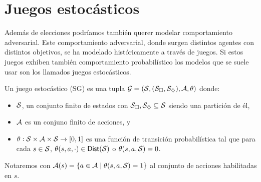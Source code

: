 



\section{Juegos estocásticos}

Además de elecciones podríamos también querer modelar comportamiento
adversarial. Este comportamiento adversarial, donde surgen distintos agentes
con distintos objetivos, se ha modelado históricamente a través de juegos. Si
estos juegos exhiben también comportamiento probabilístico los modelos que se
suele usar son los llamados juegos estocásticos.

\begin{definition}
	Un juego estocástico (SG) es una tupla $\mathcal{G} = (\mathcal{S}, (\mathcal{S}_\square, \mathcal{S}_\diamondsuit), \mathcal{A}, \theta)$ donde:
	\begin{itemize}
		\item $\mathcal{S}$, un conjunto finito de estados con $\mathcal{S}_\square, \mathcal{S}_\diamondsuit \subseteq \mathcal{S}$ siendo una partición de él,
		\item $\mathcal{A}$ es un conjuno finito de acciones, y
		\item $\theta : \mathcal{S} \times \mathcal{A} \times \mathcal{S} \rightarrow [0,1]$ es una función de transición probabilística tal que para cada $s \in \mathcal{S}$, $\theta(s, a, \cdot) \in \mathsf{Dist}(\mathcal{S})$ o  $\theta(s, a, \mathcal{S}) = 0$.
	\end{itemize}
	Notaremos con $\mathcal{A}(s) = \{a \in \mathcal{A} \mid \theta(s,a,\mathcal{S}) = 1\}$ al conjunto de acciones habilitadas en $s$.
\end{definition}

